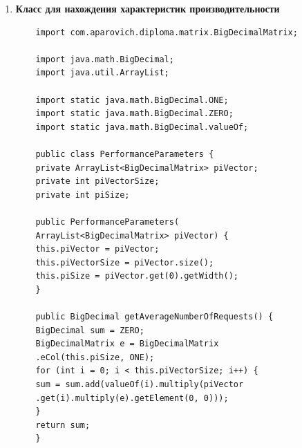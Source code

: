 \documentclass[12pt, a4paper]{article}
\begin{document}
\begin{enumerate}
\begin{verbatim}
	static {
	generators      = new HashMap<>();
	pSlashMatrices  = new HashMap<>();
	phiMatrices     = new HashMap<>();
	piVectors       = new HashMap<>();
	
	}
	
	private MatrixContainer() {
	}
	
	public static BigDecimalMatrix getG() {
	return g;
	}
	
	public static void setG(BigDecimalMatrix g) {
	MatrixContainer.g = g;
	}
	
	public static HashMap<Integer, 
	BigDecimalMatrix> getGenerators() {
	return generators;
	}
	
	public static HashMap<Integer, 
	BigDecimalMatrix> getPSlashMatrices() {
	return pSlashMatrices;
	}
	
	public static HashMap<Integer, 
	BigDecimalMatrix> getPhiMatrices() {
	return phiMatrices;
	}
	
	public static HashMap<Integer, 
	BigDecimalMatrix> getPiVectors() {
	return piVectors;
	}
	
	public static void reInit() {
	g               = null;
	generators      = new HashMap<>();
	pSlashMatrices  = new HashMap<>();
	phiMatrices     = new HashMap<>();
	piVectors       = new HashMap<>();
	}
	}
	\end{verbatim}
	\pagebreak
	\item \textbf{Класс для нахождения характеристик производительности}
	
	\begin{verbatim}
	import com.aparovich.diploma.matrix.BigDecimalMatrix;
	
	import java.math.BigDecimal;
	import java.util.ArrayList;
	
	import static java.math.BigDecimal.ONE;
	import static java.math.BigDecimal.ZERO;
	import static java.math.BigDecimal.valueOf;
	
	public class PerformanceParameters {
	private ArrayList<BigDecimalMatrix> piVector;
	private int piVectorSize;
	private int piSize;
	
	public PerformanceParameters(
	ArrayList<BigDecimalMatrix> piVector) {
	this.piVector = piVector;
	this.piVectorSize = piVector.size();
	this.piSize = piVector.get(0).getWidth();
	}
	
	public BigDecimal getAverageNumberOfRequests() {
	BigDecimal sum = ZERO;
	BigDecimalMatrix e = BigDecimalMatrix
	.eCol(this.piSize, ONE);
	for (int i = 0; i < this.piVectorSize; i++) {
	sum = sum.add(valueOf(i).multiply(piVector
	.get(i).multiply(e).getElement(0, 0)));
	}
	return sum;
	}
	

\end{verbatim}
\end{enumerate}
\end{document}
